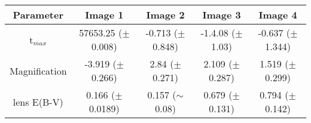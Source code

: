 \begin{table*}
\centering
\begin{tabular}{|c|c|c|c|c|}
\hline
Parameter & Image 1 & Image 2 &  Image 3 & Image 4 \\
\hline\hline
t$_{max}$ &  57653.25 ($\pm$ 0.008) & -0.713 ($\pm$  0.848) & -1.4.08  ($\pm$ 1.03) & -0.637 ($\pm$ 1.344) \\
Magnification & -3.919 ($\pm$ 0.266) & 2.84 ($\pm$ 0.271) &  2.109 ($\pm$ 0.287) & 1.519 ($\pm$ 0.299) 
\\
lens E(B-V) &  0.166 ($\pm$ 0.0189) &  0.157 ($\sim$ 0.08) & 0.679 ($\pm$ 0.131) & 0.794 ($\pm$ 0.142) \\
\hline
\end{tabular}
\label{tab:params}
\end{table*}